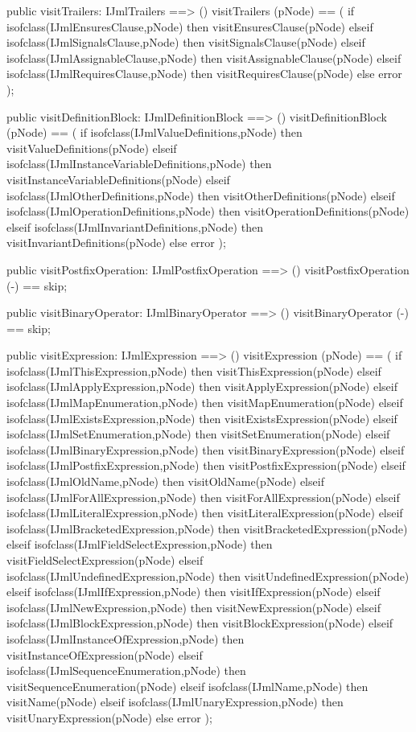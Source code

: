 \begin{vdm_al}
  public visitTrailers: IJmlTrailers ==> ()
  visitTrailers (pNode) ==
    ( if isofclass(IJmlEnsuresClause,pNode) then visitEnsuresClause(pNode)
      elseif isofclass(IJmlSignalsClause,pNode) then visitSignalsClause(pNode)
      elseif isofclass(IJmlAssignableClause,pNode) then visitAssignableClause(pNode)
      elseif isofclass(IJmlRequiresClause,pNode) then visitRequiresClause(pNode)
      else error );

  public visitDefinitionBlock: IJmlDefinitionBlock ==> ()
  visitDefinitionBlock (pNode) ==
    ( if isofclass(IJmlValueDefinitions,pNode) then visitValueDefinitions(pNode)
      elseif isofclass(IJmlInstanceVariableDefinitions,pNode) then visitInstanceVariableDefinitions(pNode)
      elseif isofclass(IJmlOtherDefinitions,pNode) then visitOtherDefinitions(pNode)
      elseif isofclass(IJmlOperationDefinitions,pNode) then visitOperationDefinitions(pNode)
      elseif isofclass(IJmlInvariantDefinitions,pNode) then visitInvariantDefinitions(pNode)
      else error );

  public visitPostfixOperation: IJmlPostfixOperation ==> ()
  visitPostfixOperation (-) == skip;

  public visitBinaryOperator: IJmlBinaryOperator ==> ()
  visitBinaryOperator (-) == skip;

  public visitExpression: IJmlExpression ==> ()
  visitExpression (pNode) ==
    ( if isofclass(IJmlThisExpression,pNode) then visitThisExpression(pNode)
      elseif isofclass(IJmlApplyExpression,pNode) then visitApplyExpression(pNode)
      elseif isofclass(IJmlMapEnumeration,pNode) then visitMapEnumeration(pNode)
      elseif isofclass(IJmlExistsExpression,pNode) then visitExistsExpression(pNode)
      elseif isofclass(IJmlSetEnumeration,pNode) then visitSetEnumeration(pNode)
      elseif isofclass(IJmlBinaryExpression,pNode) then visitBinaryExpression(pNode)
      elseif isofclass(IJmlPostfixExpression,pNode) then visitPostfixExpression(pNode)
      elseif isofclass(IJmlOldName,pNode) then visitOldName(pNode)
      elseif isofclass(IJmlForAllExpression,pNode) then visitForAllExpression(pNode)
      elseif isofclass(IJmlLiteralExpression,pNode) then visitLiteralExpression(pNode)
      elseif isofclass(IJmlBracketedExpression,pNode) then visitBracketedExpression(pNode)
      elseif isofclass(IJmlFieldSelectExpression,pNode) then visitFieldSelectExpression(pNode)
      elseif isofclass(IJmlUndefinedExpression,pNode) then visitUndefinedExpression(pNode)
      elseif isofclass(IJmlIfExpression,pNode) then visitIfExpression(pNode)
      elseif isofclass(IJmlNewExpression,pNode) then visitNewExpression(pNode)
      elseif isofclass(IJmlBlockExpression,pNode) then visitBlockExpression(pNode)
      elseif isofclass(IJmlInstanceOfExpression,pNode) then visitInstanceOfExpression(pNode)
      elseif isofclass(IJmlSequenceEnumeration,pNode) then visitSequenceEnumeration(pNode)
      elseif isofclass(IJmlName,pNode) then visitName(pNode)
      elseif isofclass(IJmlUnaryExpression,pNode) then visitUnaryExpression(pNode)
      else error );


\end{vdm_al}
